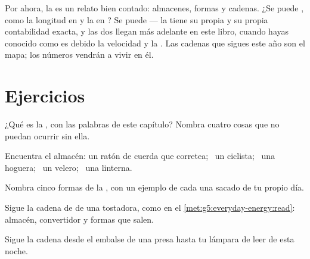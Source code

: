 \begin{remark}\label{rem:g5:everyday-energy:promise}
Por ahora, la  es un relato bien contado: almacenes, formas y
cadenas. ¿Se puede \emph{}, como la longitud en  y la
 en ? Se puede --- la  tiene su propia
 y su propia contabilidad exacta, y las dos llegan más
adelante en este libro, cuando hayas conocido como es debido la
velocidad y la . Las cadenas que sigues este año son el mapa;
los números vendrán a vivir en él.
\end{remark}

\section{Ejercicios}

\begin{exercise}[$\star$]\label{exo:g5:everyday-energy:1}
¿Qué es la , con las palabras de este capítulo? Nombra cuatro
cosas que no puedan ocurrir sin ella.
\end{exercise}

\begin{exercise}[$\star$]\label{exo:g5:everyday-energy:2}
Encuentra el almacén: un ratón de cuerda que corretea; \ un ciclista;
\ una hoguera; \ un velero; \ una linterna.
\end{exercise}

\begin{exercise}[$\star$]\label{exo:g5:everyday-energy:3}
Nombra cinco formas de la , con un ejemplo de cada una sacado
de tu propio día.
\end{exercise}

\begin{exercise}[$\star$]\label{exo:g5:everyday-energy:4}
Sigue la cadena de  de una tostadora, como en el
\cref{met:g5:everyday-energy:read}: almacén, convertidor y formas que
salen.
\end{exercise}

\begin{exercise}[$\star$]\label{exo:g5:everyday-energy:5}
Sigue la cadena desde el embalse de una presa hasta tu lámpara de leer
de esta noche.
\end{exercise}

